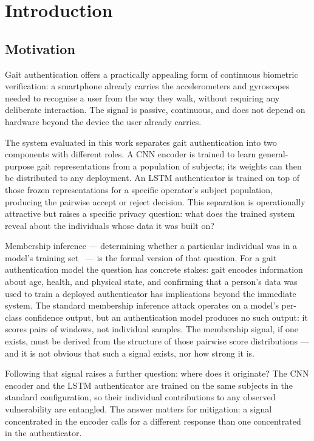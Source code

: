 \chapter{Introduction}
\label{ch:introduction}

\section{Motivation}
\label{sec:intro_motivation}

Gait authentication offers a practically appealing form of continuous biometric verification: a smartphone already carries the accelerometers and gyroscopes needed to recognise a user from the way they walk, without requiring any deliberate interaction. The signal is passive, continuous, and does not depend on hardware beyond the device the user already carries.

The system evaluated in this work separates gait authentication into two components with different roles. A CNN encoder is trained to learn general-purpose gait representations from a population of subjects; its weights can then be distributed to any deployment. An LSTM authenticator is trained on top of those frozen representations for a specific operator's subject population, producing the pairwise accept or reject decision. This separation is operationally attractive but raises a specific privacy question: what does the trained system reveal about the individuals whose data it was built on?

Membership inference — determining whether a particular individual was in a model's training set~\cite{shokri2017membership} — is the formal version of that question. For a gait authentication model the question has concrete stakes: gait encodes information about age, health, and physical state, and confirming that a person's data was used to train a deployed authenticator has implications beyond the immediate system. The standard membership inference attack operates on a model's per-class confidence output, but an authentication model produces no such output: it scores pairs of windows, not individual samples. The membership signal, if one exists, must be derived from the structure of those pairwise score distributions — and it is not obvious that such a signal exists, nor how strong it is.

Following that signal raises a further question: where does it originate? The CNN encoder and the LSTM authenticator are trained on the same subjects in the standard configuration, so their individual contributions to any observed vulnerability are entangled. The answer matters for mitigation: a signal concentrated in the encoder calls for a different response than one concentrated in the authenticator.

